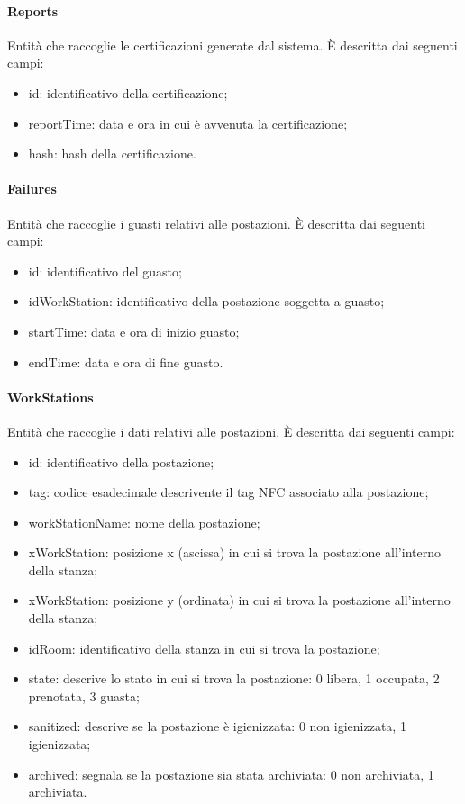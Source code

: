 \paragraph{Reports}
Entità che raccoglie le certificazioni generate dal sistema. È descritta dai seguenti campi:
\begin{itemize}
	\item id: identificativo della certificazione;
	\item reportTime: data e ora in cui è avvenuta la certificazione;
	\item hash: hash della certificazione.
\end{itemize}

\paragraph{Failures}
Entità che raccoglie i guasti relativi alle postazioni. È descritta dai seguenti campi:
\begin{itemize}
	\item id: identificativo del guasto;
	\item idWorkStation: identificativo della postazione soggetta a guasto;
	\item startTime: data e ora di inizio guasto;
	\item endTime: data e ora di fine guasto.
\end{itemize}

\paragraph{WorkStations}
Entità che raccoglie i dati relativi alle postazioni. È descritta dai seguenti campi:
\begin{itemize}
	\item id: identificativo della postazione;
	\item tag: codice esadecimale descrivente il tag NFC associato alla postazione;
	\item workStationName: nome della postazione;
	\item xWorkStation: posizione x (ascissa) in cui si trova la postazione all'interno della stanza;
	\item xWorkStation: posizione y (ordinata) in cui si trova la postazione all'interno della stanza;
	\item idRoom: identificativo della stanza in cui si trova la postazione;
	\item state: descrive lo stato in cui si trova la postazione: 0 libera, 1 occupata, 2 prenotata, 3 guasta;
	\item sanitized: descrive se la postazione è igienizzata: 0 non igienizzata, 1 igienizzata; 
	\item archived: segnala se la postazione sia stata archiviata: 0 non archiviata, 1 archiviata.
\end{itemize}


